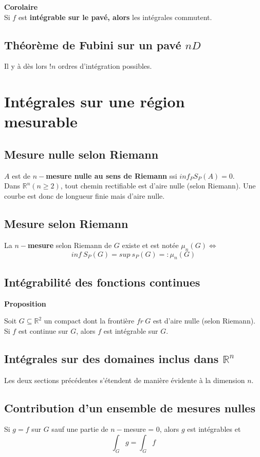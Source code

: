 \documentclass[11pt, a4paper, openany]{book}
\begin{document}
\textbf{Corolaire}\\
Si $f$ est \textbf{intégrable sur le pavé, alors} les intégrales commutent.

\subsection{Théorème de Fubini sur un pavé $nD$}
Il y à dès lors $!n$ ordres d'intégration possibles.

\section{Intégrales sur une région mesurable}
\subsection{Mesure nulle selon Riemann}
$A$ est de \textbf{$n-$mesure nulle au sens de Riemann} ssi $inf_P S_P(A) = 0$.\\

Dans $\mathbb{R}^n (n \geq 2)$, tout chemin rectifiable est d'aire nulle (selon Riemann). Une courbe est donc de longueur finie mais d'aire nulle.

\subsection{Mesure selon Riemann}
La \textbf{$n-$mesure} selon Riemann de $G$ existe et est notée $\mu_n(G) \Leftrightarrow$
$$inf\ S_P(G) = sup\ s_P(G) =: \mu_n(G)$$

\subsection{Intégrabilité des fonctions continues}
\textbf{Proposition}
\begin{center}
	Soit $G \subseteq \mathbb{R}^2$ un compact dont la frontière $fr\ G$ est d'aire nulle (selon Riemann). Si $f$ est continue sur $G$, alors $f$ est intégrable sur $G$.
\end{center}

\subsection{Intégrales sur des domaines inclus dans $\mathbb{R}^n$}
Les deux sections précédentes s'étendent de manière évidente à la dimension $n$.

\subsection{Contribution d'un ensemble de mesures nulles}
Si $g = f$ sur $G$ sauf une partie de $n-$mesure = 0, alors $g$ est intégrables et 
$$\int_G g = \int_G f$$
\end{document}
